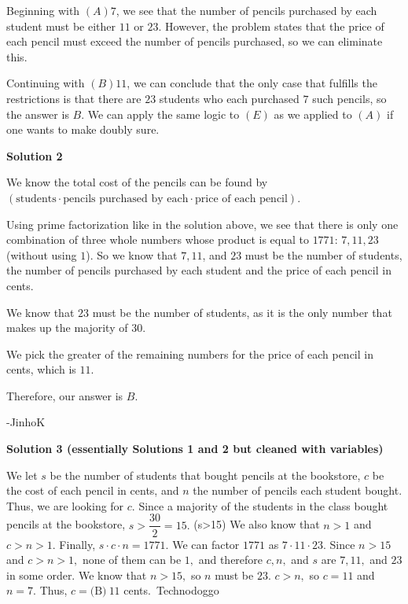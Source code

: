 \begin{enumerate}
 Beginning with $(A) 7$, we see that the number of pencils purchased by each student must be either $11$ or $23$. However, the problem states that the price of each pencil must exceed the number of pencils purchased, so we can eliminate this.

 Continuing with $(B) 11$, we can conclude that the only case that fulfills the restrictions is that there are $23$ students who each purchased $7$ such pencils, so the answer is $\boxed{B}$. We can apply the same logic to $(E)$ as we applied to $(A)$ if one wants to make doubly sure.

 



\textbf{Solution 2}

We know the total cost of the pencils can be found by $(\text{students}\cdot\text{pencils purchased by each}\cdot\text{price of each pencil})$.

 Using prime factorization like in the solution above, we see that there is only one combination of three whole numbers whose product is equal to $1771$: $7, 11, 23$ (without using $1$). So we know that $7, 11$, and $23$ must be the number of students, the number of pencils purchased by each student and the price of each pencil in cents.

 We know that $23$ must be the number of students, as it is the only number that makes up the majority of 30.

 We pick the greater of the remaining numbers for the price of each pencil in cents, which is $11$.

 Therefore, our answer is $\boxed{B}$.

 -JinhoK

 



\textbf{Solution 3 (essentially Solutions 1 and 2 but cleaned with variables)}

We let $s$ be the number of students that bought pencils at the bookstore, $c$ be the cost of each pencil in cents, and $n$ the number of pencils each student bought. Thus, we are looking for $c.$ Since a majority of the students in the class bought pencils at the bookstore, $s>\dfrac{30}2=15.$ (s>15) We also know that $n>1$ and $c>n>1.$ Finally, $s\cdot c\cdot n=1771.$ We can factor $1771$ as $7\cdot11\cdot23.$ Since $n>15$ and $c>n>1,$ none of them can be $1,$ and therefore $c,n,$ and $s$ are $7,11,$ and $23$ in some order. We know that $n>15,$ so $n$ must be $23.$ $c>n,$ so $c=11$ and $n=7.$ Thus, $c=\boxed{\text{(B)}~11}$ cents.~Technodoggo


\end{enumerate}

